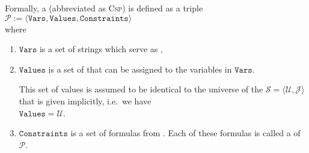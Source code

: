 \begin{Definition}[CSP] \hspace*{\fill} \linebreak
Formally, a  (abbreviated as \textsc{Csp}) is defined as a triple
\\[0.2cm]
\hspace*{1.3cm}
$\mathcal{P} := \langle \mathtt{Vars}, \mathtt{Values}, \mathtt{Constraints} \rangle$
\\[0.2cm]
where
\begin{enumerate}
\item $\mathtt{Vars}$ is a set of strings which serve as ,
\item $\mathtt{Values}$ is a set of  that can be assigned to the variables in $\mathtt{Vars}$.

      This set of values is assumed to be identical to the universe of the 
      $\mathcal{S} = \langle \mathcal{U}, \mathcal{J} \rangle$ that is given implicitly, i.e.~we have
      \\[0.2cm]
      \hspace*{1.3cm}
      $\texttt{Values} = \mathcal{U}$.
\item $\mathtt{Constraints}$ is a set of formulas from .  Each of these formulas is
      called a  of $\mathcal{P}$.  \eox
\end{enumerate}
\end{Definition}
\vspace*{-0.3cm}


